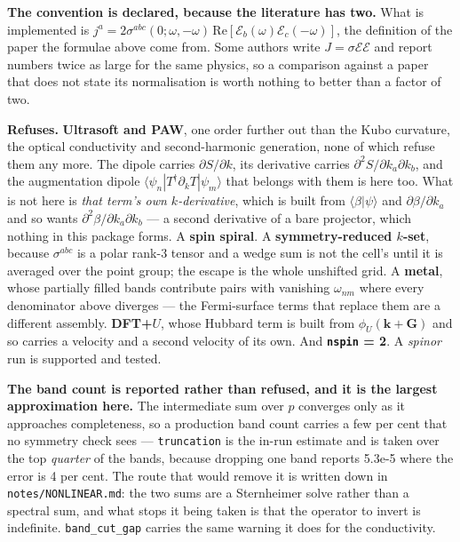 \documentclass[11pt,a4paper]{article}
\newcommand{\code}[1]{\texttt{\small #1}}
\begin{document}
\textbf{The convention is declared, because the literature has two.} What is
implemented is $j^a = 2\sigma^{abc}(0;\omega,-\omega)\,
\mathrm{Re}[\mathcal E_b(\omega)\mathcal E_c(-\omega)]$, the definition of the
paper the formulae above come from. Some authors write
$J = \sigma\mathcal E\mathcal E$ and report numbers twice as large for the same
physics, so a comparison against a paper that does not state its normalisation
is worth nothing to better than a factor of two.

\begin{refuses}
\textbf{Refuses.} \textbf{Ultrasoft and PAW}, one order further out than the
Kubo curvature, the optical conductivity and second-harmonic generation, none
of which refuse them any more. The
dipole carries $\partial S/\partial k$, its derivative carries
$\partial^2 S/\partial k_a\partial k_b$, and the augmentation dipole
$\langle\psi_n|T^\dagger\partial_k T|\psi_m\rangle$ that belongs with them is
here too. What is not here is \emph{that term's own $k$-derivative}, which is
built from $\langle\beta|\psi\rangle$ and $\partial\beta/\partial k_a$ and so
wants $\partial^2\beta/\partial k_a\partial k_b$ --- a second derivative of a
bare projector, which nothing in this package forms. A
\textbf{spin spiral}. A \textbf{symmetry-reduced $k$-set}, because
$\sigma^{abc}$ is a polar rank-3 tensor and a wedge sum is not the cell's until
it is averaged over the point group; the escape is the whole unshifted grid. A
\textbf{metal}, whose partially filled bands contribute pairs with vanishing
$\omega_{nm}$ where every denominator above diverges --- the Fermi-surface terms
that replace them are a different assembly. \textbf{DFT+$U$}, whose Hubbard term
is built from $\phi_U(\mathbf k + \mathbf G)$ and so carries a velocity and a
second velocity of its own. And \textbf{\code{nspin} = 2}. A \emph{spinor} run
is supported and tested.

\textbf{The band count is reported rather than refused, and it is the largest
approximation here.} The intermediate sum over $p$ converges only as it
approaches completeness, so a production band count carries a few per cent that
no symmetry check sees --- \code{truncation} is the in-run estimate and is taken
over the top \emph{quarter} of the bands, because dropping one band reports
5.3e-5 where the error is 4 per cent. The route that would remove it is written
down in \code{notes/NONLINEAR.md}: the two sums are a Sternheimer solve rather than a
spectral sum, and what stops it being taken is that the operator to invert is
indefinite. \code{band\_cut\_gap} carries the same warning it does for the
conductivity.
\end{refuses}
\end{document}
